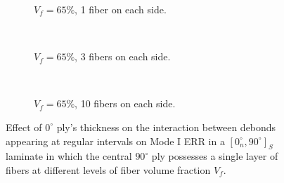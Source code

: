\documentclass[review]{elsarticle}
\begin{document}
\begin{figure}[!h]
    \begin{subfigure}[b]{0.3\textwidth}
        \caption{$V_{f}=65\%$, 1 fiber on each side.}\label{subfig:sidefiber65MIcase1}
    \end{subfigure} ~
   \begin{subfigure}[b]{0.3\textwidth}
        \caption{$V_{f}=65\%$, 3 fibers on each side.}\label{subfig:sidefiber65MIcase2}
    \end{subfigure} ~
\begin{subfigure}[b]{0.3\textwidth}
        \caption{$V_{f}=65\%$, 10 fibers on each side.}\label{subfig:sidefiber65MIcase3}
    \end{subfigure}

\caption{Effect of $0^{\circ}$ ply's thickness on the interaction between debonds appearing at regular intervals on Mode I ERR in a $\left[0^{\circ}_{n}, 90^{\circ}\right]_{S}$ laminate in which the central $90^{\circ}$ ply possesses a single layer of fibers at different levels of fiber volume fraction $V_{f}$.}\label{fig:sidefibersthicknessMI}
\end{figure}
\end{document}
